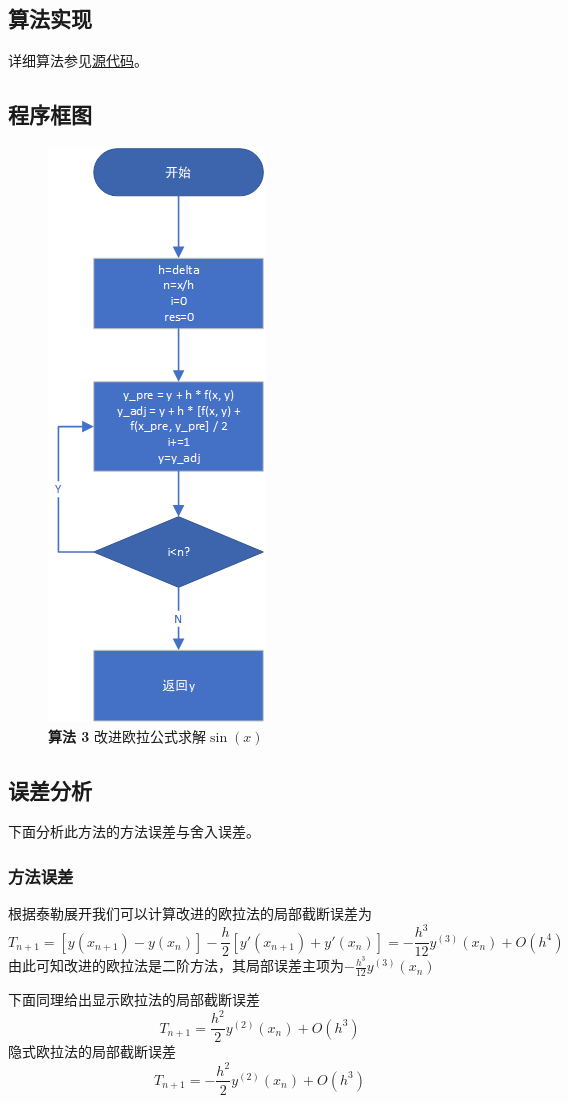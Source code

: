 \documentclass[lang=cn,11pt,a4paper]{elegantpaper}
\begin{document}
\subsection{算法实现}
详细算法参见\href{https://github.com/Antonio-Chan/SineCalculate}{源代码}。
\subsection{程序框图}
\begin{figure}[htbp]
    \centering
    \includegraphics[width=0.3\linewidth]{src/C.png}
    \centering
    \caption{\textbf{算法 3} 改进欧拉公式求解$\sin(x)$}
\end{figure}
\subsection{误差分析}
下面分析此方法的方法误差与舍入误差。
\subsubsection{方法误差}
根据泰勒展开我们可以计算改进的欧拉法的局部截断误差为
\begin{equation}
  T_{n+1}=[y(x_{n+1})-y(x_n)]-\frac{h}{2} [y'(x_{n+1})+y'(x_n)]=-\frac{h^3}{12}y^{(3)}(x_n)+O(h^4)
\end{equation}
由此可知改进的欧拉法是二阶方法，其局部误差主项为$-\frac{h^3}{12}y^{(3)}(x_n)$

下面同理给出显示欧拉法的局部截断误差
\begin{equation}
  T_{n+1}=\frac{h^2}{2}y^{(2)}(x_n)+O(h^3)
\end{equation}
隐式欧拉法的局部截断误差
\begin{equation}
  T_{n+1}=-\frac{h^2}{2}y^{(2)}(x_n)+O(h^3)
\end{equation}
\end{document}
